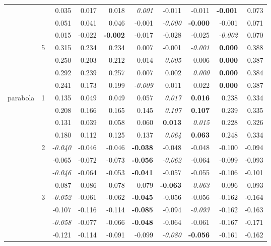 \documentclass[authoryear, review, 11pt]{elsarticle}
\begin{document}
\begin{table}
\begin{center}
{\begin{tabular}{ccrrrrrrrr}
   &  & 0.035 & 0.017 & 0.018 & \emph{0.001} & -0.011 & -0.011 & \textbf{-0.001} & 0.073 \\ 
   &  & 0.051 & 0.041 & 0.046 & -0.001 & \emph{-0.000} & \textbf{-0.000} & -0.001 & 0.071 \\ 
   &  & 0.015 & -0.022 & \textbf{-0.002} & -0.017 & -0.028 & -0.025 & \emph{-0.002} & 0.070 \\ 
  \cline{3-10}
   & \multirow{4}{*}{5} & 0.315 & 0.234 & 0.234 & 0.007 & -0.001 & \emph{-0.001} & \textbf{0.000} & 0.388 \\ 
   &  & 0.250 & 0.203 & 0.212 & 0.014 & \emph{0.005} & 0.006 & \textbf{0.000} & 0.387 \\ 
   &  & 0.292 & 0.239 & 0.257 & 0.007 & 0.002 & \emph{0.000} & \textbf{0.000} & 0.384 \\ 
   &  & 0.241 & 0.173 & 0.199 & \emph{-0.009} & 0.011 & 0.022 & \textbf{0.000} & 0.387 \\ 
  \hline
  \multirow{20}{*}{parabola} & \multirow{4}{*}{1} & 0.135 & 0.049 & 0.049 & 0.057 & \emph{0.017} & \textbf{0.016} & 0.238 & 0.334 \\ 
   &  & 0.208 & 0.166 & 0.165 & 0.145 & \emph{0.107} & \textbf{0.107} & 0.239 & 0.335 \\ 
   &  & 0.131 & 0.039 & 0.058 & 0.060 & \textbf{0.013} & \emph{0.015} & 0.228 & 0.326 \\ 
   &  & 0.180 & 0.112 & 0.125 & 0.137 & \emph{0.064} & \textbf{0.063} & 0.248 & 0.334 \\ 
  \cline{3-10}
   & \multirow{4}{*}{2} & \emph{-0.040} & -0.046 & -0.046 & \textbf{-0.038} & -0.048 & -0.048 & -0.100 & -0.094 \\ 
   &  & -0.065 & -0.072 & -0.073 & \textbf{-0.056} & \emph{-0.062} & -0.064 & -0.099 & -0.093 \\ 
   &  & \emph{-0.046} & -0.064 & -0.053 & \textbf{-0.041} & -0.057 & -0.055 & -0.106 & -0.101 \\ 
   &  & -0.087 & -0.086 & -0.078 & -0.079 & \textbf{-0.063} & \emph{-0.063} & -0.096 & -0.093 \\ 
  \cline{3-10}
   & \multirow{4}{*}{3} & \emph{-0.052} & -0.061 & -0.062 & \textbf{-0.045} & -0.056 & -0.056 & -0.162 & -0.164 \\ 
   &  & -0.107 & -0.116 & -0.114 & \textbf{-0.085} & -0.094 & \emph{-0.093} & -0.162 & -0.163 \\ 
   &  & \emph{-0.058} & -0.077 & -0.066 & \textbf{-0.048} & -0.064 & -0.061 & -0.167 & -0.171 \\ 
   &  & -0.121 & -0.114 & -0.091 & -0.099 & \emph{-0.080} & \textbf{-0.056} & -0.161 & -0.162 \\ 

\end{tabular}}
\end{center}
\end{table}
\end{document}
